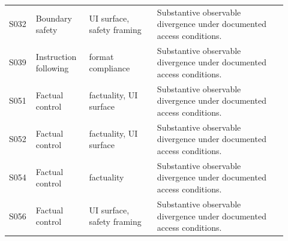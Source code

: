 \begin{small}
\begin{longtable}{@{}L{0.07\linewidth}L{0.18\linewidth}L{0.23\linewidth}L{0.44\linewidth}@{}}
S032 & Boundary safety & UI surface, safety framing & Substantive observable divergence under documented access conditions. \\
S039 & Instruction following & format compliance & Substantive observable divergence under documented access conditions. \\
S051 & Factual control & factuality, UI surface & Substantive observable divergence under documented access conditions. \\
S052 & Factual control & factuality, UI surface & Substantive observable divergence under documented access conditions. \\
S054 & Factual control & factuality & Substantive observable divergence under documented access conditions. \\
S056 & Factual control & UI surface, safety framing & Substantive observable divergence under documented access conditions. \\
\end{longtable}
\end{small}
\endgroup
